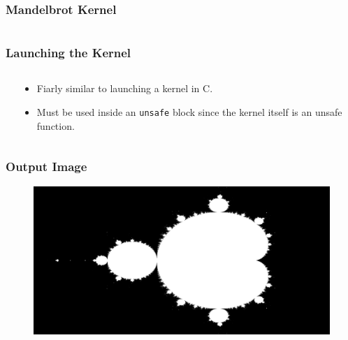 \documentclass[aspectratio=169]{beamer}
\begin{document}
\begin{frame}
	\frametitle{Mandelbrot Kernel}
	\begin{columns}
		\begin{column}{0.5\textwidth}
			
		\end{column}
		\begin{column}{0.45\textwidth}
			
		\end{column}
	\end{columns}
\end{frame}

\begin{frame}
	\frametitle{Launching the Kernel}
	\begin{columns}
		\begin{column}{0.55\textwidth}
			
		\end{column}
		\begin{column}{0.3\textwidth}
			\begin{itemize}
				\item Fiarly similar to launching a kernel in C.
				\item Must be used inside an \Verb|unsafe| block since the kernel itself is an unsafe function.
			\end{itemize}
		\end{column}
	\end{columns}
\end{frame}

\begin{frame}
	\frametitle{Output Image}
	\begin{figure}[H]
		\centering
		\includegraphics[width=\textwidth]{./figures/mandelbrot.png}
	\end{figure}
\end{frame}
\end{document}
